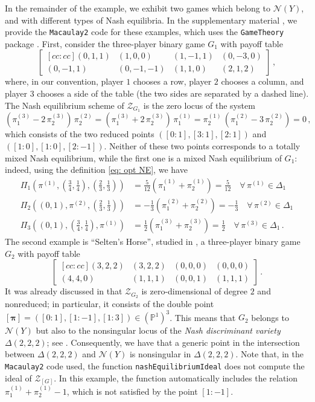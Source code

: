 \documentclass[12pt]{article}
\theoremstyle{definition}
\newenvironment{example}
{\pushQED{\qed}\renewcommand{\qedsymbol}{$\diamond$}\examplex}
{\popQED\endexamplex}
\newcommand{\PP}{{\mathbb P}}
\def\bpi{{\boldsymbol{\pi}}}
\newcommand{\kn}{{\mathcal N}}
\newcommand{\kz}{{\mathcal Z}}
\begin{document}
\begin{example}
In the remainder of the example, we exhibit two games which belong to $\kn(Y)$, and with different types of Nash equilibria. In the supplementary material \cite{sodomaco2026supplementary}, we provide the \texttt{Macaulay2} code for these examples, which uses the \texttt{GameTheory} package \cite{GameTheorySource}. First, consider the three-player binary game $G_1$ with payoff table
\[
    \begin{bmatrix}[cc:cc]
        (0,1,1) & (1,0,0) & (1,-1,1) & (0,-3,0)\\[2pt]
        (0,-1,1) & (0,-1,-1) & (1,1,0) & (2,1,2)
    \end{bmatrix}\,,
\]
where, in our convention, player $1$ chooses a row, player $2$ chooses a column, and player $3$ chooses a side of the table (the two sides are separated by a dashed line). The Nash equilibrium scheme of $\kz_{G_1}$ is the zero locus of the system
\[
(\pi_1^{(3)}-2\,\pi_2^{(3)})\,\pi_2^{(2)} = (\pi_1^{(3)}+2\,\pi_2^{(3)})\,\pi_1^{(1)} = \pi_2^{(1)}\,(\pi_1^{(2)}-3\,\pi_2^{(2)}) = 0\,,
\]
which consists of the two reduced points $([0:1],[3:1],[2:1])$ and $([1:0],[1:0],[2:-1])$. Neither of these two points corresponds to a totally mixed Nash equilibrium, while the first one is a mixed Nash equilibrium of $G_1$: indeed, using the definition \eqref{eq: opt NE}, we have
\begin{align*}
    \Pi_1\left(\pi^{(1)},\left(\frac{3}{4},\frac{1}{4}\right),\left(\frac{2}{3},\frac{1}{3}\right)\right) &= \frac{5}{12}\left(\pi_1^{(1)}+\pi_2^{(1)}\right) = \frac{5}{12}\quad\forall\,\pi^{(1)}\in\Delta_1\\
    \Pi_2\left((0,1),\pi^{(2)},\left(\frac{2}{3},\frac{1}{3}\right)\right) &= -\frac{1}{3}\left(\pi_1^{(2)}+\pi_2^{(2)}\right) = -\frac{1}{3}\quad\forall\,\pi^{(2)}\in\Delta_1\\
    \Pi_3\left((0,1),\left(\frac{3}{4},\frac{1}{4}\right),\pi^{(1)}\right) &= \frac{1}{2}\left(\pi_1^{(3)}+\pi_2^{(3)}\right) = \frac{1}{2}\quad\forall\,\pi^{(3)}\in\Delta_1\,.
\end{align*}
The second example is ``Selten's Horse'', studied in \cite[Section 4.3]{jahani2022automated}, a three-player binary game $G_2$ with payoff table
\[
    \begin{bmatrix}[cc:cc]
        (3,2,2) & (3,2,2) & (0,0,0) & (0,0,0)\\[2pt]
        (4,4,0) & (1,1,1) & (0,0,1) & (1,1,1)
    \end{bmatrix}\,.
\]
It was already discussed in \cite[Example 3.13]{abo2026vector} that $\kz_{G_2}$ is zero-dimensional of degree $2$ and nonreduced; in particular, it consists of the double point $[\bpi]=([0:1],[1:-1],[1:3])\in(\PP^1)^3$. This means that $G_2$ belongs to $\kn(Y)$ but also to the nonsingular locus of the {\em Nash discriminant variety} $\Delta(2,2,2)$; see \cite[Definition 3.2]{abo2026vector}. Consequently, we have that a generic point in the intersection between $\Delta(2,2,2)$ and $\kn(Y)$ is nonsingular in $\Delta(2,2,2)$. Note that, in the {\tt Macaulay2} code used, the function {\tt nashEquilibriumIdeal} does not compute the ideal of $\kz_{[G]}$. In this example, the function automatically includes the relation $\pi_1^{(1)}+\pi_2^{(1)}-1$, which is not satisfied by the point $[1:-1]$.

\end{example}
\end{document}
